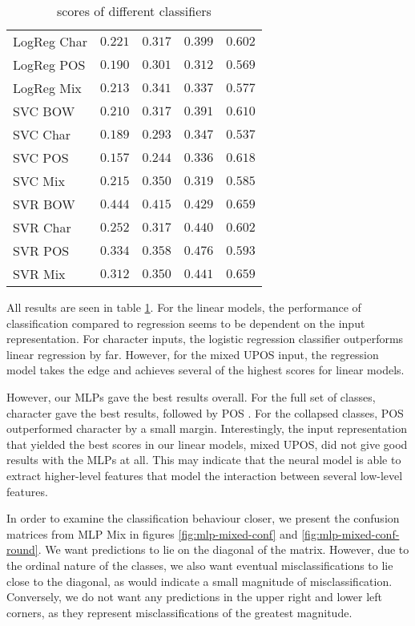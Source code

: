 \begin{table}
\begin{tabular}{lrrrr}
    LogReg Char & $0.221$ & $0.317$ & $0.399$ & $0.602$ \\
    LogReg POS & $0.190$ & $0.301$ & $0.312$ & $0.569$ \\
    LogReg Mix & $0.213$ & $0.341$ & $0.337$ & $0.577$ \\
    \midrule
    SVC BOW & $0.210$ & $0.317$ & $0.391$ & $0.610$ \\
    SVC Char & $0.189$ & $0.293$ & $0.347$ & $0.537$ \\
    SVC POS & $0.157$ & $0.244$ & $0.336$ & $0.618$ \\
    SVC Mix & $0.215$ & $0.350$ & $0.319$ & $0.585$ \\
    \midrule
    SVR BOW & $\mathbf{0.444}$ & $\mathbf{0.415}$ & $0.429$ & $\mathbf{0.659}$ \\
    SVR Char & $0.252$ & $0.317$ & $0.440$ & $0.602$ \\
    SVR POS & $0.334$ & $0.358$ & $\mathbf{0.476}$ & $0.593$ \\
    SVR Mix & $0.312$ & $0.350$ & $0.441$ & $\mathbf{0.659}$ \\
    \bottomrule
  \end{tabular}
  \caption{\FI scores of different classifiers}
  \label{tab:baseline-accuracies}
\end{table}

All results are seen in table \ref{tab:baseline-accuracies}. For the linear
models, the performance of classification compared to regression seems to be
dependent on the input representation. For character \ngram inputs, the
logistic regression classifier outperforms linear regression by far. However,
for the mixed UPOS input, the regression model takes the edge and achieves
several of the highest \FI scores for linear models. 

However, our \acp{MLP} gave the best results overall. For the full set of
classes, character \ngrams gave the best results, followed by POS \ngrams.
For the collapsed classes, POS \ngrams outperformed character \ngrams by a
small margin. Interestingly, the input representation that yielded the best
scores in our linear models, mixed UPOS, did not give good results with the
\acp{MLP} at all. This may indicate that the neural model is able to extract
higher-level features that model the interaction between several low-level
\ngram features.

In order to examine the classification behaviour closer, we present the
confusion matrices from MLP Mix in figures \ref{fig:mlp-mixed-conf} and
\ref{fig:mlp-mixed-conf-round}. We want predictions to lie on the diagonal of
the matrix. However, due to the ordinal nature of the classes, we also want
eventual misclassifications to lie close to the diagonal, as would indicate a
small magnitude of misclassification. Conversely, we do not want any
predictions in the upper right and lower left corners, as they represent
misclassifications of the greatest magnitude.

